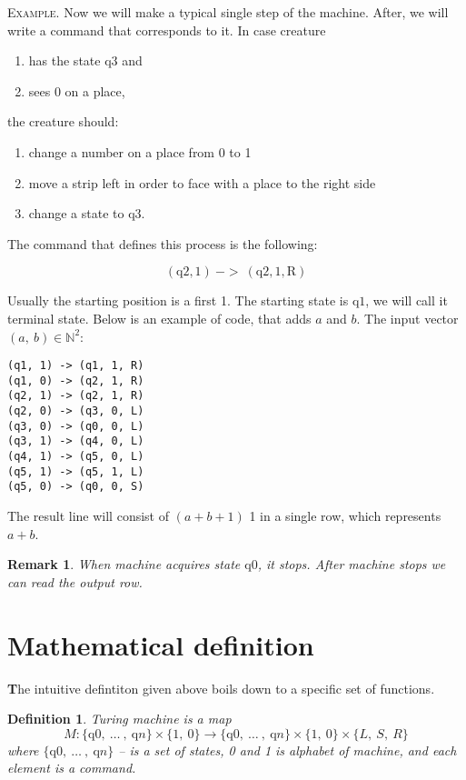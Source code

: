 \documentclass[12pt]{article}
\newcommand\tab[1][-1em]{\hspace*{#1}}
\newtheorem*{remark}{Remark}
\newtheorem{definition}{Definition}[section]
\begin{document}
\begin{addmargin}[3em]{3em}
\tab
\textsc{Example.} Now we will make a typical single step of the machine. After, we will write a command that corresponds to it. In case creature
\begin{enumerate}
\item has the state $\mathrm{q}3$ and \item sees 0 on a place,
\end{enumerate}
the creature should: 
\begin{enumerate}
\item change a number on a place from 0 to 1 \item move a strip left in order to face with a place to the right side \item change a state to $\mathrm{q}3$. 
\end{enumerate}


The command that defines this process is the following:

{\large $$(\mathrm{q}2, 1)\ ->\ (\mathrm{q}2, 1, \mathrm{R})$$}
\end{addmargin}
Usually the starting position is a first 1. The starting state is $\mathrm{q}1$, we will call it terminal state.
Below is an example of code, that adds $a$ and $b$. The input vector $(a,\ b)\in\mathbb{N}^2$:

\begin{lstlisting}
(q1, 1) -> (q1, 1, R)
(q1, 0) -> (q2, 1, R)
(q2, 1) -> (q2, 1, R)
(q2, 0) -> (q3, 0, L)
(q3, 0) -> (q0, 0, L)
(q3, 1) -> (q4, 0, L)
(q4, 1) -> (q5, 0, L)
(q5, 1) -> (q5, 1, L)
(q5, 0) -> (q0, 0, S)
\end{lstlisting}

The result line will consist of $(a+b+1)$ 1 in a single row, which represents $a+b$.
\begin{remark} When machine acquires state $\mathrm{q}0$, it stops. After machine stops we can read the output row.
\end{remark}

\section{Mathematical definition}
\textbf{\large T}he intuitive defintiton given above boils down to a specific set of functions. 
\begin{definition}
Turing machine is a map
$$ M:\{\mathrm{q}0,\ \dots\ ,\ \mathrm{q}n\} \times \{ 1,\ 0\} \rightarrow \{\mathrm{q}0,\ \dots\ ,\ \mathrm{q}n\} \times \{ 1,\ 0\} \times \{L,\ S,\ R\}$$
where $\{\mathrm{q}0,\ \dots\ ,\ \mathrm{q}n\}$ -- is a set of states, 0 and 1 is alphabet of machine, and each element is a command.
\end{definition}
\end{document}
